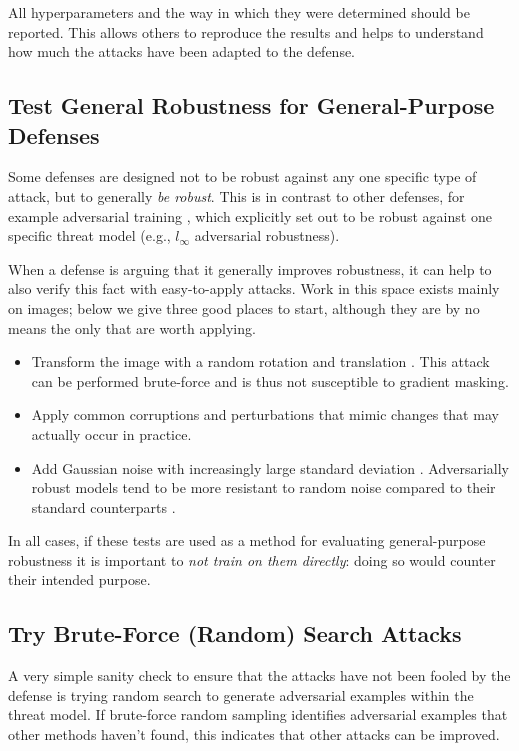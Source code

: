 \documentclass{article} %
\begin{document}
All hyperparameters and the way in which they were determined should be reported.
%
This allows others to reproduce the results and helps to
understand how much the attacks
have been adapted to the defense.

\subsection{Test General Robustness for General-Purpose Defenses}
\label{sec:generalrobustness}
Some defenses are designed not to be robust against any one specific
type of attack, but to generally \emph{be robust}.
%
This is in contrast to other defenses, for example adversarial training
\citep{goodfellow2014explaining,madry2017towards}, which explicitly set out
to be robust against one specific threat model (e.g., $l_\infty$ adversarial
robustness).

When a defense is arguing that it generally improves robustness, it can
help to also verify this fact with easy-to-apply attacks.
%
Work in this space exists mainly on images; below we give three
good places to start, although they are by no means the only
that are worth applying.
%
\begin{itemize}
\item Transform the image with a random rotation and translation
  \citep{engstrom2017rotation}. This attack can be performed
  brute-force and is thus not susceptible to gradient masking.
\item Apply common corruptions and perturbations
  \citep{hendrycks2018benchmarking} that mimic changes that may actually
  occur in practice.
\item Add Gaussian noise with increasingly large standard deviation
  \citep{ford2019adversarial}. Adversarially robust models tend to be more resistant to random noise compared to their standard counterparts
  \citep{fawzi2016robustness}.
\end{itemize}
In all cases, if these tests are used as a method for evaluating general-purpose
robustness it is important to \emph{not train on them directly}: doing so
would counter their intended purpose.

\subsection{Try Brute-Force (Random) Search Attacks}
\label{sec:randomnoise}

A very simple sanity check to ensure that the attacks have not
been fooled by the defense is trying random search to
generate adversarial examples within the threat model.
%
If brute-force random sampling
identifies adversarial examples that other methods haven't found, this
indicates that other attacks can be improved.
\end{document}
